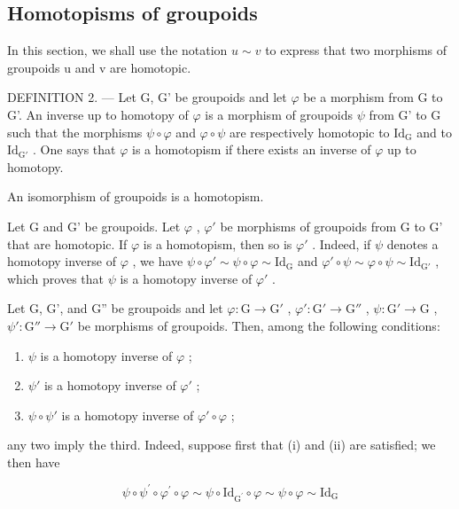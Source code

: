 \subsection{Homotopisms of groupoids}

In this section, we shall use the notation \(u \sim v\) to express that two morphisms of groupoids u and v are homotopic.

DEFINITION 2. --- Let G, G' be groupoids and let \(\varphi\) be a morphism from G to G'. An inverse up to homotopy of \(\varphi\) is a morphism of groupoids \(\psi\) from G' to G such that the morphisms \(\psi \circ \varphi\) and \(\varphi \circ \psi\) are respectively homotopic to \(\mathrm{Id}_{\mathrm{G}}\) and to \(\mathrm{Id}_{\mathrm{G}'}\) . One says that \(\varphi\) is a homotopism if there exists an inverse of \(\varphi\) up to homotopy.

An isomorphism of groupoids is a homotopism.

Let G and G' be groupoids. Let \(\varphi\) , \(\varphi'\) be morphisms of groupoids from G to G' that are homotopic. If \(\varphi\) is a homotopism, then so is \(\varphi'\) . Indeed, if \(\psi\) denotes a homotopy inverse of \(\varphi\) , we have \(\psi \circ \varphi' \sim \psi \circ \varphi \sim \mathrm{Id}_{\mathrm{G}}\) and \(\varphi' \circ \psi \sim \varphi \circ \psi \sim \mathrm{Id}_{\mathrm{G}'}\) , which proves that \(\psi\) is a homotopy inverse of \(\varphi'\) .

Let G, G', and G'' be groupoids and let \(\varphi\colon\mathrm{G}\to\mathrm{G}'\) , \(\varphi'\colon\mathrm{G}'\to\mathrm{G}''\) , \(\psi\colon\mathrm{G}'\to\mathrm{G}\) , \(\psi'\colon\mathrm{G}''\to\mathrm{G}'\) be morphisms of groupoids. Then, among the following conditions:

\begin{enumerate}
\def\labelenumi{(\roman{enumi})}
\item
  \(\psi\) is a homotopy inverse of \(\varphi\) ;
\item
  \(\psi'\) is a homotopy inverse of \(\varphi'\) ;
\item
  \(\psi \circ \psi'\) is a homotopy inverse of \(\varphi' \circ \varphi\) ;
\end{enumerate}

any two imply the third. Indeed, suppose first that (i) and (ii) are satisfied; we then have

\[
\psi \circ \psi^ {\prime} \circ \varphi^ {\prime} \circ \varphi \sim \psi \circ \mathrm{Id} _ {\mathrm{G} ^ {\prime}} \circ \varphi \sim \psi \circ \varphi \sim \mathrm{Id} _ {\mathrm{G}}
\]

